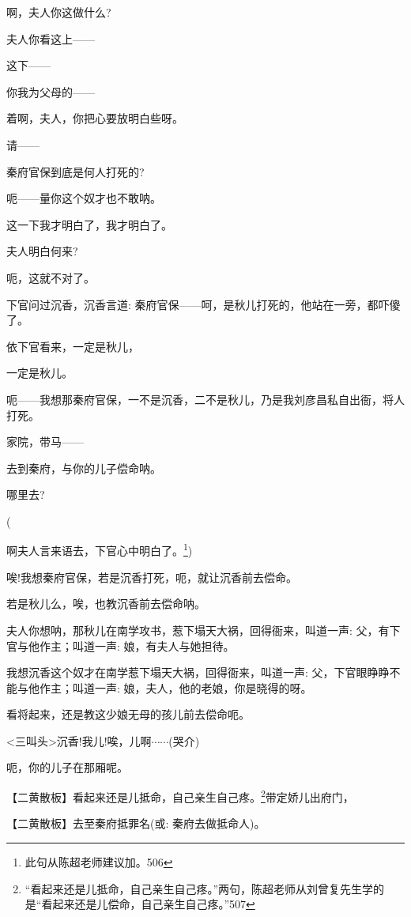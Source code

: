 {啊，夫人你这做什么?}

{夫人你看这上------}

{这下------}

{你我为父母的------}

{着啊，夫人，你把心要放明白些呀。}

{请------}

{秦府官保到底是何人打死的?}

{呃------量你这个奴才也不敢呐。}

{这一下我才明白了，我才明白了。}

{夫人明白何来?}

{呃，这就不对了。}

{下官问过沉香，沉香言道: 秦府官保------呵，是秋儿打死的，他站在一旁，都吓傻了。}

{依下官看来，一定是秋儿，}

{一定是秋儿。}

{呃------我想那秦府官保，一不是沉香，二不是秋儿，乃是我刘彦昌私自出衙，将人打死。}

{家院，带马------}

{去到秦府，与你的儿子偿命呐。}

{哪里去?}

{(}

啊夫人言来语去，下官心中明白了{。}\footnote{ 此句从陈超老师建议加。{506}}{)}

{唉!我想秦府官保，若是沉香打死，呃，就让沉香前去偿命。}

{若是秋儿么，唉，也教沉香前去偿命呐。}

{夫人你想呐，那秋儿在南学攻书，惹下塌天大祸，回得衙来，叫道一声: 父，有下官与他作主；叫道一声: 娘，有夫人与她担待。}

{我想沉香这个奴才在南学惹下塌天大祸，回得衙来，叫道一声: 父，下官眼睁睁不能与他作主；叫道一声: 娘，夫人，他的老娘，你是晓得的呀。}

{看将起来，还是教这少娘无母的孩儿前去偿命呃。}

{\textless{}三叫头\textgreater{}沉香!我儿!唉，儿啊$\cdots{}\cdots{}$(哭介)}

{呃，你的儿子在那厢呢。}

\setlength{\hangindent}{60pt} {【{\akai 二黄散板}】看起来还是儿抵命，自己亲生自己疼。}\footnote{ {``看起来还是儿抵命，自己亲生自己疼。''两句，}陈超老师从刘曾复先生学的是``{看起来还是儿偿命}，{自己亲生自己疼。}''{507}}{带定娇儿出府门，}

\setlength{\hangindent}{60pt} {【{\akai 二黄散板}】去至秦府抵罪名({\akai 或}: 秦府去做抵命人)。}

